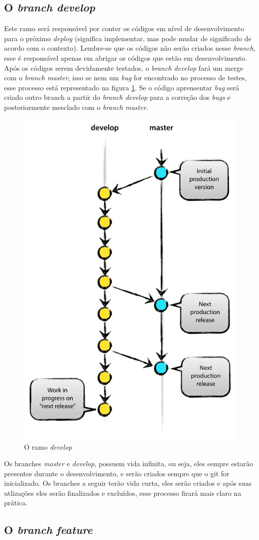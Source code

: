 \documentclass[12pt,openright,oneside,a4paper,english,brazil]{abntex2}
\begin{document}
\subsection{O \textit{branch develop}}

Este ramo será responsável por conter os códigos em nível de desenvolvimento para o próximo \textit{deploy} (significa implementar, mas pode mudar de significado de acordo com o contexto). Lembre-se que os códigos não serão criados nesse \textit{branch}, esse é responsável apenas em abrigar os códigos que estão em desenvolvimento. Após os códigos serem devidamente testados, o \textit{branch develop} fará um merge com o \textit{branch master}, isso se nem um \textit{bug} for encontrado no processo de testes, esse processo está representado na figura \ref{develop}. Se o código aprensentar \textit{bug} será criado outro branch a partir do \textit{branch develop} para a correção dos \textit{bugs} e posteriormente mesclado com o \textit{branch master}.

\begin{figure}[H]
	\caption{\label{develop}O ramo \textit{develop}}
	\begin{center}
		\includegraphics[width=0.3\linewidth]{develop}
	\end{center}
\end{figure}
	
Os branches \textit{master} e \textit{develop}, possuem vida infinita, ou seja, eles sempre estarão presentes durante o desenvolvimento, e serão criados sempre que o git for inicializado. Os branches a seguir terão vida curta, eles serão criados e após suas utlizações eles serão finalizados e excluídos, esse processo firará mais claro na prática.

\subsection{O \textit{branch} \textit{feature}}
\end{document}
